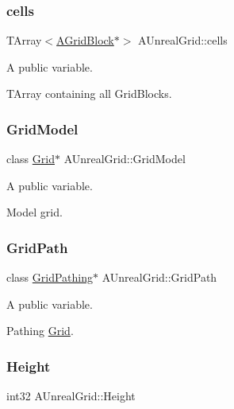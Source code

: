 \subsubsection{\texorpdfstring{cells}{cells}}
{\footnotesize\ttfamily T\+Array$<$\hyperlink{class_a_grid_block}{A\+Grid\+Block}$\ast$$>$ A\+Unreal\+Grid\+::cells}



A public variable. 

T\+Array containing all Grid\+Blocks. \hypertarget{class_a_unreal_grid_a1bc505d6a6df9d8d57db4d92bf7a0636}{}\label{class_a_unreal_grid_a1bc505d6a6df9d8d57db4d92bf7a0636} 
\subsubsection{\texorpdfstring{Grid\+Model}{GridModel}}
{\footnotesize\ttfamily class \hyperlink{class_grid}{Grid}$\ast$ A\+Unreal\+Grid\+::\+Grid\+Model}



A public variable. 

Model grid. \hypertarget{class_a_unreal_grid_a5a108c220c0bfded8c7312aabbbcba82}{}\label{class_a_unreal_grid_a5a108c220c0bfded8c7312aabbbcba82} 
\subsubsection{\texorpdfstring{Grid\+Path}{GridPath}}
{\footnotesize\ttfamily class \hyperlink{class_grid_pathing}{Grid\+Pathing}$\ast$ A\+Unreal\+Grid\+::\+Grid\+Path}



A public variable. 

Pathing \hyperlink{class_grid}{Grid}. \hypertarget{class_a_unreal_grid_a7674836c06f6c4022f98bdecd72cb89c}{}\label{class_a_unreal_grid_a7674836c06f6c4022f98bdecd72cb89c} 
\subsubsection{\texorpdfstring{Height}{Height}}
{\footnotesize\ttfamily int32 A\+Unreal\+Grid\+::\+Height}



